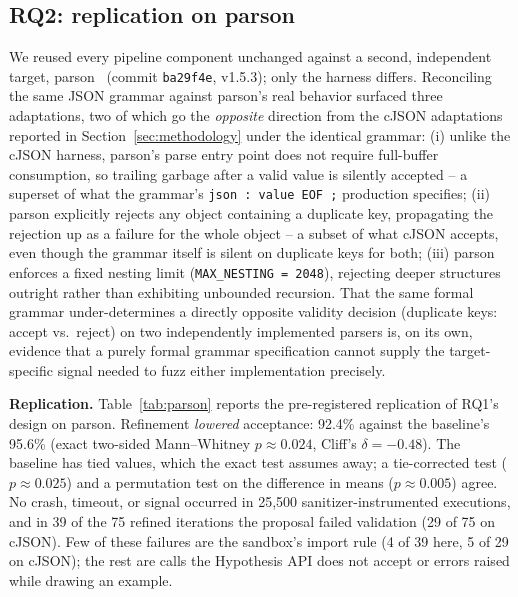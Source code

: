 \subsection{RQ2: replication on parson}
\label{sec:evaluation-parson}

We reused every pipeline component unchanged against a second, independent
target, parson~\cite{gabis2024parson} (commit \texttt{ba29f4e}, v1.5.3); only
the harness differs.
Reconciling the same JSON grammar against parson's real behavior surfaced
three adaptations, two of which go the \emph{opposite} direction from the
cJSON adaptations reported in Section~\ref{sec:methodology} under the
identical grammar: (i) unlike the cJSON harness, parson's parse entry point
does not require full-buffer consumption, so trailing garbage after a valid
value is silently accepted -- a superset of what the grammar's
\texttt{json : value EOF ;} production specifies; (ii) parson explicitly
rejects any object containing a duplicate key, propagating the rejection up
as a failure for the whole object -- a subset of what cJSON accepts, even
though the grammar itself is silent on duplicate keys for both; (iii) parson
enforces a fixed nesting limit (\texttt{MAX\_NESTING = 2048}), rejecting
deeper structures outright rather than exhibiting unbounded recursion. That
the same formal grammar under-determines a directly opposite validity
decision (duplicate keys: accept vs.\ reject) on two independently
implemented parsers is, on its own, evidence that a purely formal grammar
specification cannot supply the target-specific signal needed to fuzz either
implementation precisely.

\textbf{Replication.} Table~\ref{tab:parson} reports the pre-registered
replication of RQ1's design on parson. Refinement \emph{lowered} acceptance:
92.4\% against the baseline's 95.6\% (exact two-sided Mann--Whitney
$p \approx 0.024$, Cliff's $\delta = -0.48$). The baseline has tied values,
which the exact test assumes away; a tie-corrected test ($p \approx 0.025$)
and a permutation test on the difference in means ($p \approx 0.005$) agree.
No crash, timeout, or signal occurred in 25{,}500 sanitizer-instrumented
executions, and in 39 of the 75 refined iterations the proposal failed
validation (29 of 75 on cJSON). Few of these failures are the sandbox's import
rule (4 of 39 here, 5 of 29 on cJSON); the rest are calls the Hypothesis API
does not accept or errors raised while drawing an example.

